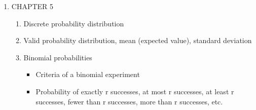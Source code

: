 \documentclass{article}
\begin{document}
\begin{enumerate}
\begin{enumerate}
\begin{itemize}
                \end{itemize}
                
        \end{enumerate}
        
    \item CHAPTER 5 
    
        \begin{enumerate}
        
            \item Discrete probability distribution
            
            \item Valid probability distribution, mean (expected value), standard deviation
            
            \item Binomial probabilities
            
                \begin{itemize}
                
                    \item Criteria of a binomial experiment
                    
                    \item Probability of exactly r successes, at most r successes, at least r successes, fewer than r successes, more than r successes, etc.
                    
                \end{itemize}
        \end{enumerate}
        
\end{enumerate}
\end{document}
